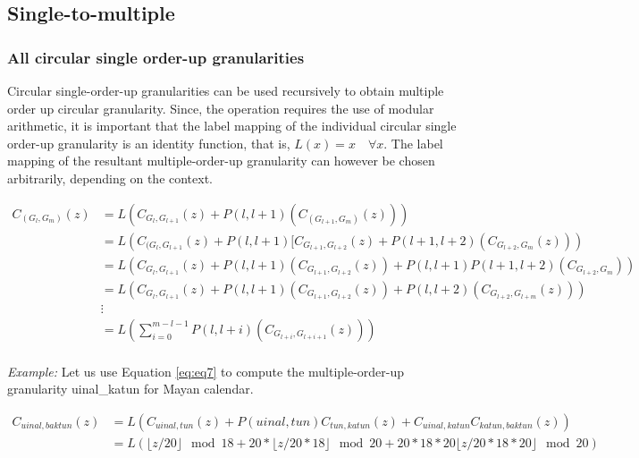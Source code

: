 \documentclass[12pt]{article}
\begin{document}
\hypertarget{sec:single-to-multiple}{%
\subsection{Single-to-multiple}\label{sec:single-to-multiple}}

\hypertarget{sec:all-circular}{%
\subsubsection{All circular single order-up granularities}\label{sec:all-circular}}

Circular single-order-up granularities can be used recursively to obtain multiple order up circular granularity. Since, the operation requires the use of modular arithmetic, it is important that the label mapping of the individual circular single order-up granularity is an identity function, that is, \(L(x) = x\quad \forall x\). The label mapping of the resultant multiple-order-up granularity can however be chosen arbitrarily, depending on the context.

\begin{equation} \label{eq:eq7}
\begin{split}
C_{(G_l,G_m)}(z) & = L(C_{G_l,G_{l+1}}(z) + P(l, l+1)(C_{(G_{l+1},G_m)}(z))) \\
  & =   L(C_{(G_l,G_{l+1}}(z) + P(l, l+1)[ C_{G_{l+1},G_{l+2}}(z) + P(l+1, l+2)( C_{G_{l+2}, G_m}(z))) \\
  & =  L(C_{G_l,G_{l+1}}(z) + P(l, l+1)(C_{G_{l+1},G_{l+2}}(z)) + P(l, l+1)P(l+1, l+2)(C_{G_{l+2}, G_{m}}))\\
  & =  L(C_{G_l,G_{l+1}}(z) + P(l, l+1)(C_{G_{l+1},G_{l+2}}(z)) + P(l, l+2)(C_{G_{l+2},G_{l+m}}(z)))\\
  &\vdots\\
  & = L(\sum_{i=0}^{m - l - 1} P(l, l+i)(C_{G_{l+i},G_{l+i+1}}(z)))\\
\end{split}
\end{equation}

\emph{Example:} Let us use Equation \ref{eq:eq7} to compute the multiple-order-up granularity uinal\_katun for Mayan calendar.

\begin{equation} \label{eq8}
\begin{split}
C_{uinal, baktun}(z) & = L(C_{uinal, tun}(z) + P(uinal, tun)C_{tun,katun}(z) + C_{uinal, katun}C_{katun, baktun}(z)) \\
              & = L(\lfloor z/20\rfloor \mod 18  +
              20*\lfloor z/20*18\rfloor \mod 20 +
              20*18*20\lfloor z/20*18*20\rfloor \mod 20) \\
\end{split}
\end{equation}
\end{document}

